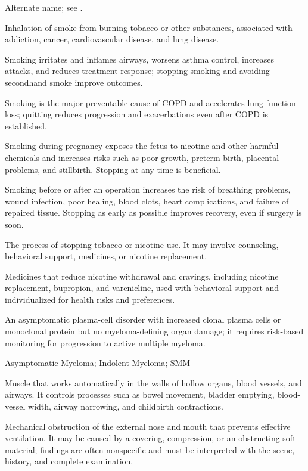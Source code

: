  Alternate name; see .

 Inhalation of smoke from burning tobacco or other substances, associated with addiction, cancer, cardiovascular disease, and lung disease.

 Smoking irritates and inflames airways, worsens asthma control, increases attacks, and reduces treatment response; stopping smoking and avoiding secondhand smoke improve outcomes.

 Smoking is the major preventable cause of COPD and accelerates lung-function loss; quitting reduces progression and exacerbations even after COPD is established.

 Smoking during pregnancy exposes the fetus to nicotine and other harmful chemicals and increases risks such as poor growth, preterm birth, placental problems, and stillbirth. Stopping at any time is beneficial.

 Smoking before or after an operation increases the risk of breathing problems, wound infection, poor healing, blood clots, heart complications, and failure of repaired tissue. Stopping as early as possible improves recovery, even if surgery is soon.

 The process of stopping tobacco or nicotine use. It may involve counseling, behavioral support, medicines, or nicotine
replacement.

 Medicines that reduce nicotine withdrawal and cravings, including nicotine replacement, bupropion, and varenicline, used with behavioral support and individualized for health risks and preferences.

 An asymptomatic plasma-cell disorder with increased clonal plasma cells or monoclonal protein but no myeloma-defining organ damage; it requires risk-based monitoring for progression to active multiple myeloma.

\synonyms
Asymptomatic Myeloma; Indolent Myeloma; SMM

 Muscle that works automatically in the walls of hollow organs, blood vessels, and airways. It controls processes such as bowel movement, bladder emptying, blood-vessel width, airway narrowing, and childbirth contractions.

 Mechanical obstruction of the external nose and mouth that prevents effective
ventilation. It may be caused by a covering, compression, or an obstructing soft
material; findings are often nonspecific and must be interpreted with the scene,
history, and complete examination.

